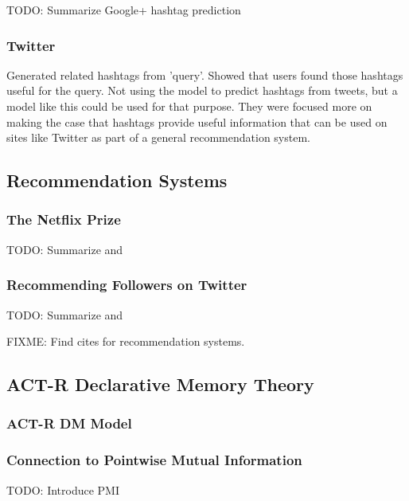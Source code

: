 \documentclass[man]{apa6}
\begin{document}
TODO: Summarize Google+ hashtag prediction \cite{GoogleKeynote2013}

\subsubsection{Twitter}

\cite{Efron2010} Generated related hashtags from 'query'.
Showed that users found those hashtags useful for the query.
Not using the model to predict hashtags from tweets, but a model like this could be used for that purpose.
They were focused more on making the case that hashtags provide useful information that can be used on sites like Twitter as part of a general recommendation system.

\subsection{Recommendation Systems}

\subsubsection{The Netflix Prize}

TODO: Summarize and \cite{Bennett2007}

\subsubsection{Recommending Followers on Twitter}

TODO: Summarize and \cite{Hannon2010}

FIXME: Find cites for recommendation systems.

\subsection{ACT-R Declarative Memory Theory}

\cite{Anderson2004}

\subsubsection{ACT-R DM Model}

\subsubsection{Connection to Pointwise Mutual Information}

TODO: Introduce PMI \cite{Farahat2004}
\end{document}
